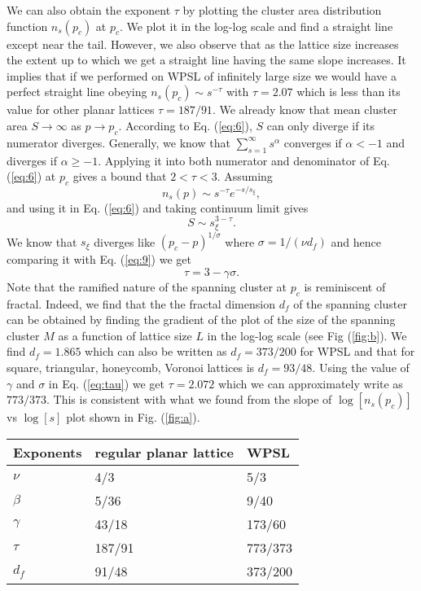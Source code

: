 \documentclass[twocolumn,showpacs,preprintnumbers,amsmath,amssymb]{article}
\begin{document}
We can also obtain the exponent $\tau$ by plotting the cluster area distribution function $n_s(p_c)$ at $p_c$. We
plot it in the log-log scale and find a straight line except near the tail. However, we also observe that 
as the lattice size increases the extent up to which we get a straight line having the same slope increases. It implies
that if we performed on WPSL of infinitely large size we would have a perfect straight line obeying
$n_s(p_c)\sim s^{-\tau}$
with $\tau=2.07$ which is less than its value for other planar lattices $\tau=187/91$. We already know that mean
cluster area $S\rightarrow \infty$ as $p\rightarrow p_c$. According to Eq. (\ref{eq:6}), $S$ can only diverge
if its numerator diverges. Generally, we know that $\sum_{s=1}^\infty s^\alpha$ converges if $\alpha<-1$ and diverges if 
$\alpha\geq -1$. Applying it into both numerator and denominator of Eq. (\ref{eq:6}) at $p_c$ gives a bound that
$2<\tau<3$. Assuming
\begin{equation}
n_s(p)\sim s^{-\tau}e^{-s/s_\xi},
\end{equation}
and using it in Eq. (\ref{eq:6}) and taking continuum limit gives
\begin{equation}
S\sim s_\xi^{3-\tau}.
\end{equation}
We know that $s_\xi$ diverges like $(p_c-p)^{1/\sigma}$ where $\sigma=1/(\nu d_f)$ and hence comparing it with Eq. (\ref{eq:9})
we get
\begin{equation}
\label{eq:tau}
\tau=3-\gamma \sigma.
\end{equation}
Note that the ramified nature of the spanning cluster at $p_c$ is reminiscent of fractal. Indeed, we find that the 
the fractal dimension $d_f$ of the spanning cluster can be obtained by finding 
the gradient of the plot of the size of the spanning cluster $M$ as a function of lattice size $L$ in the log-log scale (see Fig (\ref{fig:b}). We find $d_f=1.865$ which 
can also be written as $d_f=373/200$ for WPSL and that for  square, triangular, honeycomb,
Voronoi lattices is $d_f=93/48$. Using the value of $\gamma$ and $\sigma$ in Eq. (\ref{eq:tau}) we get 
$\tau=2.072$ which we can approximately write as $773/373$. This is consistent with what we found from the slope of $\log[n_s(p_c)]$ vs $\log[s]$ plot shown in Fig. (\ref{fig:a}).   



\begin{center}
    \begin{tabular}{| l | l | l |}
    \hline
    Exponents & regular planar lattice & WPSL \\ \hline
    $\nu$ & 4/3 & 5/3  \\ \hline
    $\beta$ & 5/36 & 9/40  \\ \hline
    $\gamma$ & 43/18 & 173/60  \\ \hline
   $ \tau$ & 187/91 & 773/373 \\ \hline
$d_f$ & 91/48 & 373/200 \\

    \hline
    \end{tabular}
\end{center}
\end{document}
